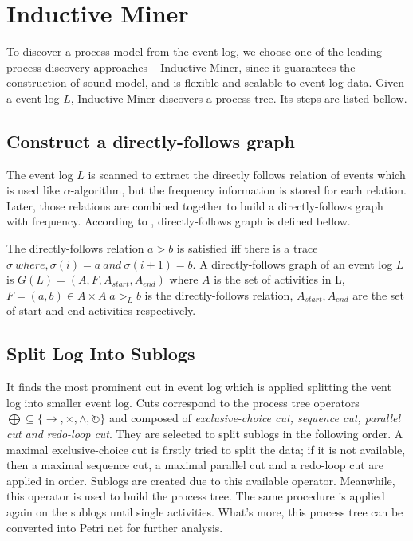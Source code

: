 \section{Inductive Miner}
To discover a process model from the event log, we choose  one of the leading process discovery approaches -- Inductive Miner, since it guarantees the construction of sound model, and is flexible and scalable to event log data. Given a event log $L$, Inductive Miner discovers a process tree. Its steps are listed bellow. 
\subsection{Construct a directly-follows graph}
The event log $L$ is scanned to extract the directly follows relation of events which is used like $\alpha$-algorithm, but the frequency information is stored for each relation. Later, those relations are combined together to build a directly-follows graph with frequency. According to \cite{van2016data, leemans2013discovering}, directly-follows graph is defined bellow.
\begin{definition}
 The directly-follows relation $a > b$ is satisfied iff there is a trace $\sigma\ where, \sigma(i)=a \ and \ \sigma(i+1)=b$.
 A directly-follows graph of an event log $L$ is $G(L) = (A, F, A_{start}, A_{end}) $ where $A$ is the set of activities in L, $F={(a,b) \in A \times A | a >_L b} $ is the directly-follows relation, $A_{start}, A_{end}$ are the set of start and end activities respectively.
\end{definition}

\subsection{Split Log Into Sublogs}
It finds the most prominent cut in event log which is applied splitting the vent log into smaller event log. Cuts correspond to the process tree operators $\bigoplus \subseteq \{\rightarrow, \times, \land, \circlearrowright \}$ and composed of \emph{exclusive-choice cut, sequence cut, parallel cut and redo-loop cut}. They are selected to split sublogs in the following order. A maximal exclusive-choice cut is firstly tried to split the data; if it is not available, then a maximal sequence cut, a  maximal parallel cut and a redo-loop cut are applied in order. Sublogs are created due to this available operator. Meanwhile, this operator is used to build the process tree. 
The same procedure is applied again on the sublogs until single activities. What's more, this process tree can be converted into Petri net for further analysis. 

